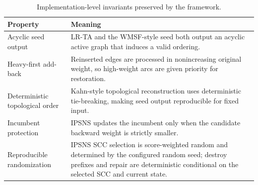 \begin{table}[t]
\centering
\caption{Implementation-level invariants preserved by the framework.}
\label{tab:algorithm-invariants}
\begin{tabular}{>{\raggedright\arraybackslash}p{2.8cm} >{\raggedright\arraybackslash}p{9.2cm}}
\toprule
Property & Meaning \\
\midrule
Acyclic seed output & LR-TA and the WMSF-style seed both output an acyclic active graph that induces a valid ordering. \\
Heavy-first add-back & Reinserted edges are processed in nonincreasing original weight, so high-weight arcs are given priority for restoration. \\
Deterministic topological order & Kahn-style topological reconstruction uses deterministic tie-breaking, making seed output reproducible for fixed input. \\
Incumbent protection & IPSNS updates the incumbent only when the candidate backward weight is strictly smaller. \\
Reproducible randomization & IPSNS SCC selection is score-weighted random and determined by the configured random seed; destroy prefixes and repair are deterministic conditional on the selected SCC and current state. \\
\bottomrule
\end{tabular}
\end{table}
